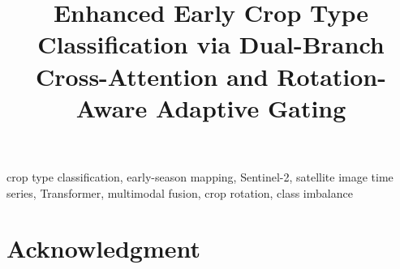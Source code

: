 \documentclass[conference]{IEEEtran}
\begin{document}
\title{Enhanced Early Crop Type Classification via Dual-Branch Cross-Attention and Rotation-Aware Adaptive Gating}

\author{
}

\maketitle

\begin{abstract}

\end{abstract}

\begin{IEEEkeywords}
crop type classification, early-season mapping, Sentinel-2, satellite image time series, Transformer, multimodal fusion, crop rotation, class imbalance
\end{IEEEkeywords}










\section*{Acknowledgment}



\end{document}
